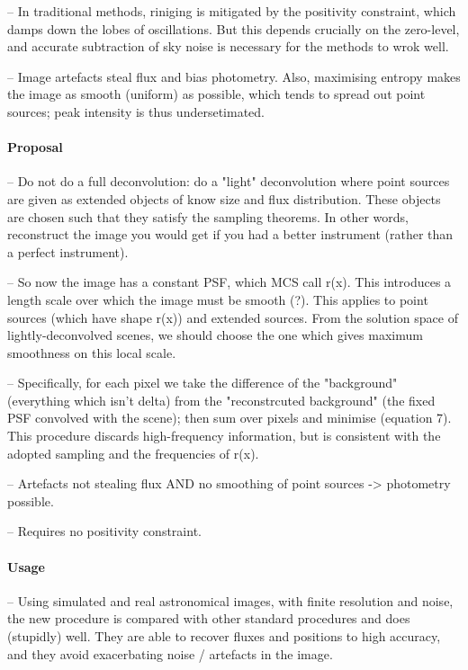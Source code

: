 \documentclass[letterpaper, 11pt]{article}
\begin{document}
-- In traditional methods, riniging is mitigated by the positivity 
constraint, which damps down the lobes of oscillations. But this depends crucially on the zero-level, and accurate subtraction of sky noise 
is necessary for the methods to wrok well.

-- Image artefacts steal flux and bias photometry. Also, maximising entropy makes the image as 
smooth (uniform) as possible, which tends to spread out point sources; peak intensity is thus undersetimated.


\paragraph{Proposal}

-- Do not do a full deconvolution: do a "light" deconvolution where point sources are given as extended objects of know size and flux 
distribution. These objects are chosen such that they satisfy the sampling theorems. In other words, reconstruct the image you would get if 
you had a better instrument (rather than a perfect instrument).

-- So now the image has a constant PSF, which MCS call r(x). This introduces a length scale over which the image must be smooth (?). This 
applies to point sources (which have shape r(x)) and extended sources. From the solution space of lightly-deconvolved scenes, we should 
choose the one which gives maximum smoothness on this local scale.

-- Specifically, for each pixel we take the difference of the "background" (everything which isn't delta) from the "reconstrcuted background" 
(the fixed PSF convolved with the scene); then sum over pixels and minimise (equation 7). This procedure discards high-frequency information, 
but is consistent with the adopted sampling and the frequencies of r(x).

-- Artefacts not stealing flux AND no smoothing of point sources -> 
photometry possible.

-- Requires no positivity constraint.


\paragraph{Usage}

-- Using simulated and real astronomical images, with finite resolution and noise, the new procedure is compared with other standard 
procedures and does (stupidly) well. They are able to recover fluxes and positions to high accuracy, and they avoid exacerbating noise / 
artefacts in the image.
\end{document}
